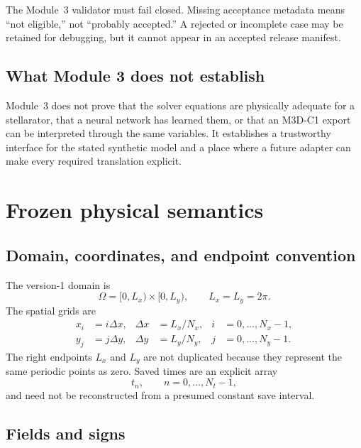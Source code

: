 \documentclass[11pt]{article}
\begin{document}
\begin{checkpointbox}
The Module~3 validator must fail closed. Missing acceptance metadata means ``not eligible,'' not ``probably accepted.'' A rejected or incomplete case may be retained for debugging, but it cannot appear in an accepted release manifest.
\end{checkpointbox}

\subsection{What Module 3 does not establish}

Module~3 does not prove that the solver equations are physically adequate for a stellarator, that a neural network has learned them, or that an M3D-C1 export can be interpreted through the same variables. It establishes a trustworthy interface for the stated synthetic model and a place where a future adapter can make every required translation explicit.

\section{Frozen physical semantics}
\label{sec:semantics}

\subsection{Domain, coordinates, and endpoint convention}

The version-1 domain is
\begin{equation}
\Omega=[0,L_x)\times[0,L_y),
\qquad L_x=L_y=2\pi.
\end{equation}
The spatial grids are
\begin{align}
x_i&=i\Delta x, & \Delta x&=L_x/N_x, & i&=0,\ldots,N_x-1,\\
y_j&=j\Delta y, & \Delta y&=L_y/N_y, & j&=0,\ldots,N_y-1.
\end{align}
The right endpoints $L_x$ and $L_y$ are not duplicated because they represent the same periodic points as zero. Saved times are an explicit array
\begin{equation}
t_n,\qquad n=0,\ldots,N_t-1,
\end{equation}
and need not be reconstructed from a presumed constant save interval.

\subsection{Fields and signs}
\end{document}
